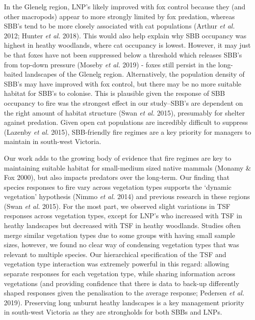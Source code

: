 \documentclass[11pt,a4paper,titlepage,twoside,openright]{style/unimelbthesis}
\begin{document}
\begin{mainmatter}
In the Glenelg region, LNP's likely improved with fox control because they (and other macropods) appear to more strongly limited by fox predation, whereas SBB's tend to be more closely associated with cat populations (Arthur \emph{et al.} 2012; Hunter \emph{et al.} 2018). This would also help explain why SBB occupancy was highest in heathy woodlands, where cat occupancy is lowest. However, it may just be that foxes have not been suppressed below a threshold which releases SBB's from top-down pressure (Moseby \emph{et al.} 2019) - foxes still persist in the long-baited landscapes of the Glenelg region. Alternatively, the population density of SBB's may have improved with fox control, but there may be no more suitable habitat for SBB's to colonise. This is plausible given the response of SBB occupancy to fire was the strongest effect in our study--SBB's are dependent on the right amount of habitat structure (Swan \emph{et al.} 2015), presumably for shelter against predation. Given open cat populations are incredibly difficult to suppress (Lazenby \emph{et al.} 2015), SBB-friendly fire regimes are a key priority for managers to maintain in south-west Victoria.

Our work adds to the growing body of evidence that fire regimes are key to maintaining suitable habitat for small-medium sized native mammals (Monamy \& Fox 2000), but also impacts predators over the long-term. Our finding that species responses to fire vary across vegetation types supports the `dynamic vegetation' hypothesis (Nimmo \emph{et al.} 2014) and previous research in these regions (Swan \emph{et al.} 2015). For the most part, we observed slight variations in TSF responses across vegetation types, except for LNP's who increased with TSF in heathy landscapes but decreased with TSF in heathy woodlands. Studies often merge similar vegetation types due to some groups with having small sample sizes, however, we found no clear way of condensing vegetation types that was relevant to multiple species. Our hierarchical specification of the TSF and vegetation type interaction was extremely powerful in this regard: allowing separate responses for each vegetation type, while sharing information across vegetations (and providing confidence that there is data to back-up differently shaped responses given the penalisation to the average response; Pedersen \emph{et al.} 2019). Preserving long unburnt heathy landscapes is a key management priority in south-west Victoria as they are strongholds for both SBBs and LNPs.


\end{mainmatter}
\end{document}
